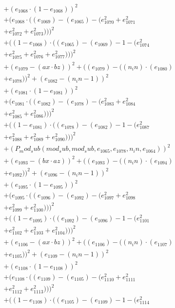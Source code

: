 \documentclass[10pt, a4paper]{article}
\begin{document}
\begin{small}
\begin{align*}
& + (e_{1068}  \cdot  (1 - e_{1068}))^{2} \\
& + (e_{1068}  \cdot  ((e_{1069}) - (e_{1065}) - (e_{1070}^{2} + e_{1071}^{2} \\
& + e_{1072}^{2} + e_{1073}^{2})))^{2} \\
& + ((1 - e_{1068})  \cdot  ((e_{1065}) - (e_{1069}) - 1 - (e_{1074}^{2} \\
& + e_{1075}^{2} + e_{1076}^{2} + e_{1077}^{2})))^{2} \\
& + (e_{1079} - (ax  \cdot  bz))^{2} + ((e_{1079}) - ((n_in)  \cdot  (e_{1080}) \\
& + e_{1078}))^{2} + (e_{1082} - (n_in - 1))^{2} \\
& + (e_{1081}  \cdot  (1 - e_{1081}))^{2} \\
& + (e_{1081}  \cdot  ((e_{1082}) - (e_{1078}) - (e_{1083}^{2} + e_{1084}^{2} \\
& + e_{1085}^{2} + e_{1086}^{2})))^{2} \\
& + ((1 - e_{1081})  \cdot  ((e_{1078}) - (e_{1082}) - 1 - (e_{1087}^{2} \\
& + e_{1088}^{2} + e_{1089}^{2} + e_{1090}^{2})))^{2} \\
& + (P_mod_sub(mod_sub, mod_sub, e_{1065}, e_{1078}, n_in, e_{1064}))^{2} \\
& + (e_{1093} - (bx  \cdot  az))^{2} + ((e_{1093}) - ((n_in)  \cdot  (e_{1094}) \\
& + e_{1092}))^{2} + (e_{1096} - (n_in - 1))^{2} \\
& + (e_{1095}  \cdot  (1 - e_{1095}))^{2} \\
& + (e_{1095}  \cdot  ((e_{1096}) - (e_{1092}) - (e_{1097}^{2} + e_{1098}^{2} \\
& + e_{1099}^{2} + e_{1100}^{2})))^{2} \\
& + ((1 - e_{1095})  \cdot  ((e_{1092}) - (e_{1096}) - 1 - (e_{1101}^{2} \\
& + e_{1102}^{2} + e_{1103}^{2} + e_{1104}^{2})))^{2} \\
& + (e_{1106} - (ax  \cdot  bz))^{2} + ((e_{1106}) - ((n_in)  \cdot  (e_{1107}) \\
& + e_{1105}))^{2} + (e_{1109} - (n_in - 1))^{2} \\
& + (e_{1108}  \cdot  (1 - e_{1108}))^{2} \\
& + (e_{1108}  \cdot  ((e_{1109}) - (e_{1105}) - (e_{1110}^{2} + e_{1111}^{2} \\
& + e_{1112}^{2} + e_{1113}^{2})))^{2} \\
& + ((1 - e_{1108})  \cdot  ((e_{1105}) - (e_{1109}) - 1 - (e_{1114}^{2} \\

\end{align*}
\end{small}
\end{document}
